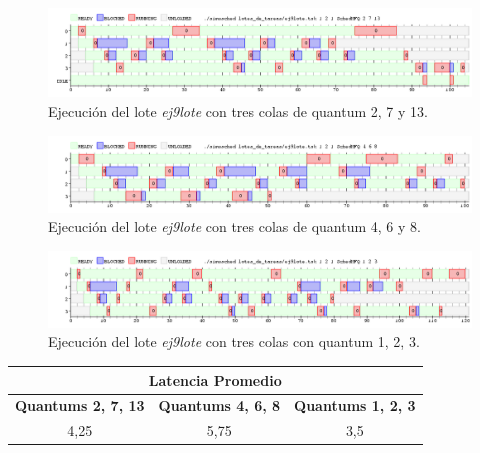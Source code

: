 \newpage

\begin{figure}[!h]
	\begin{center}
		\includegraphics[width=500px]{imagenes/ej9_1.png}
		\caption{Ejecución del lote \emph{ej9lote} con tres colas de quantum 2, 7 y 13.}
		\label{fig:grafico_ej9_1}
	\end{center}
\end{figure}

\begin{figure}[!h]
	\begin{center}
		\includegraphics[width=500px]{imagenes/ej9_2.png}
		\caption{Ejecución del lote \emph{ej9lote} con tres colas de quantum 4, 6 y 8.}
		\label{fig:grafico_ej9_2}
	\end{center}
\end{figure}

\begin{figure}[!h]
	\begin{center}
		\includegraphics[width=500px]{imagenes/ej9_3.png}
		\caption{Ejecución del lote \emph{ej9lote} con tres colas con quantum 1, 2, 3.}
		\label{fig:grafico_ej9_3}
	\end{center}
\end{figure}

\begin{center}
	\begin{tabular}{|c|c|c|}
		\hline
		\multicolumn{3}{|c|}{\large{\textbf{Latencia Promedio}}} \\
		\hline
		\textbf{Quantums 2, 7, 13} & \textbf{Quantums 4, 6, 8} & \textbf{Quantums 1, 2, 3} \\
		\hline
		4,25 & 5,75 & 3,5 \\
		\hline
	\end{tabular}
\end{center}

